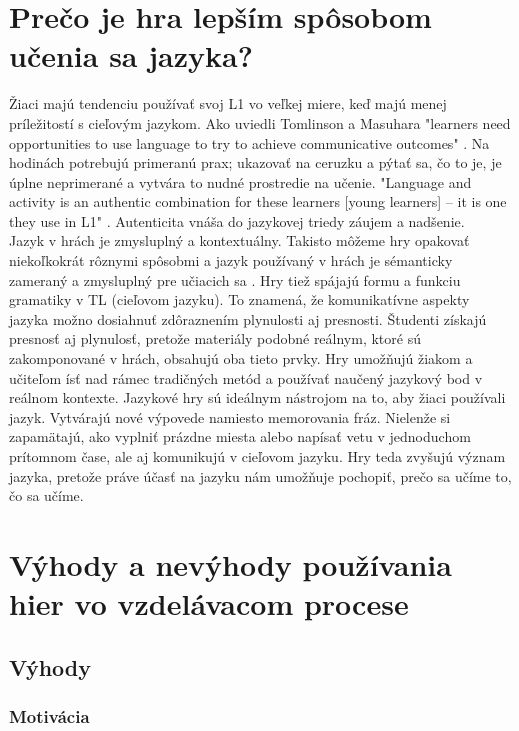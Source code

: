 \documentclass[10pt,twoside,slovak,a4paper]{article}
\begin{document}
\section{Prečo je hra lepším spôsobom učenia sa jazyka?} \label{ina}
\qquad Žiaci majú tendenciu používať svoj L1 vo veľkej miere, keď majú menej príležitostí s cieľovým jazykom. Ako uviedli Tomlinson a Masuhara \cite{BibEntry2012Dec} "learners  need  opportunities  to  use language  to  try  to  achieve  communicative  outcomes" .  Na hodinách potrebujú primeranú prax; ukazovať na ceruzku a pýtať sa, čo to je, je úplne neprimerané a vytvára to nudné prostredie na učenie. "Language and activity is an authentic combination for these learners [young learners] – it is one they use in L1" .  Autenticita vnáša do jazykovej triedy záujem a nadšenie.  \\
\qquad Jazyk v hrách je zmysluplný a kontextuálny. Takisto môžeme hry opakovať niekoľkokrát rôznymi spôsobmi a jazyk používaný v hrách je sémanticky zameraný a zmysluplný pre učiacich sa \cite{BibEntry2012Dec} . Hry tiež spájajú formu a funkciu gramatiky v TL (cieľovom jazyku). To znamená, že komunikatívne aspekty jazyka možno dosiahnuť zdôraznením plynulosti aj presnosti. Študenti získajú presnosť aj plynulosť, pretože materiály podobné reálnym, ktoré sú zakomponované v hrách, obsahujú oba tieto prvky. Hry umožňujú žiakom a učiteľom ísť nad rámec tradičných metód a používať naučený jazykový bod v reálnom kontexte. Jazykové hry sú ideálnym nástrojom na to, aby žiaci používali jazyk. Vytvárajú nové výpovede namiesto memorovania fráz. Nielenže si zapamätajú, ako vyplniť prázdne miesta alebo napísať vetu v jednoduchom prítomnom čase, ale aj komunikujú v cieľovom jazyku. Hry teda zvyšujú význam jazyka, pretože práve účasť na jazyku nám umožňuje pochopiť, prečo sa učíme to, čo sa učíme.\\

\section{Výhody a nevýhody používania hier vo vzdelávacom procese} \label{Advantages}
\subsection{Výhody} 
\subsubsection{Motivácia}
\end{document}
